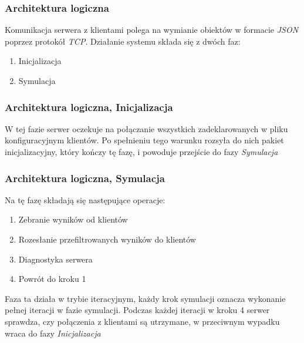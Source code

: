 \documentclass{beamer}
\begin{document}
  \begin{frame}
    \frametitle{Architektura logiczna}
    Komunikacja serwera z klientami polega na wymianie obiektów w formacie
    \textit{JSON} poprzez protokół \textit{TCP}. Działanie systemu składa się z
    dwóch faz:
    \begin{enumerate}
      \item <1-> Inicjalizacja
      \item <1-> Symulacja
    \end{enumerate}
  \end{frame}
  
  \begin{frame}
    \frametitle{Architektura logiczna, Inicjalizacja}
    W tej fazie serwer oczekuje na połączanie wszystkich zadeklarowanych w pliku
    konfiguracyjnym klientów. Po spełnieniu tego warunku rozsyła do nich
    pakiet inicjalizacyjny, który kończy tę fazę, i powoduje przejście do fazy
    \textit{Symulacja}
  \end{frame}
  
  \begin{frame}
    \frametitle{Architektura logiczna, Symulacja}
    Na tę fazę składają się następujące operacje:
    \begin{enumerate}
      \item <1-> Zebranie wyników od klientów
      \item <1-> Rozesłanie przefiltrowanych wyników do klientów
      \item <1-> Diagnostyka serwera
      \item <1-> Powrót do kroku 1
    \end{enumerate}
    Faza ta działa w trybie iteracyjnym, każdy krok symulacji oznacza wykonanie
    pełnej iteracji w fazie symulacji. Podczas każdej iteracji w kroku 4
    serwer sprawdza, czy połączenia z klientami są utrzymane, w przeciwnym
    wypadku wraca do fazy \textit{Inicjalizacja}
  \end{frame}
\end{document}
